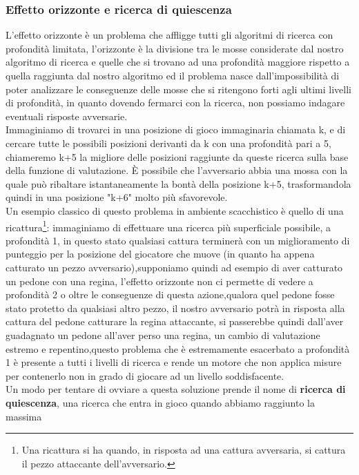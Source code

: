 \subsubsection{Effetto orizzonte e ricerca di quiescenza}
L'effetto orizzonte è un problema che affligge tutti gli algoritmi di ricerca con profondità limitata, l'orizzonte è la divisione 
tra le mosse considerate dal nostro algoritmo di ricerca e quelle che si trovano ad una profondità maggiore rispetto a quella raggiunta dal nostro algoritmo 
ed il problema nasce dall'impossibilità di poter analizzare le conseguenze delle mosse che si ritengono forti agli ultimi livelli di profondità, in quanto dovendo fermarci con la ricerca,
non possiamo indagare eventuali risposte avversarie.\\
Immaginiamo di trovarci in una posizione di gioco immaginaria chiamata k, e di cercare tutte le possibili posizioni derivanti da k con una profondità pari a 5,
chiameremo k+5 la migliore delle posizioni raggiunte da queste ricerca sulla base della funzione di valutazione. È possibile che
l'avversario abbia una mossa con la quale può ribaltare istantaneamente la bontà della posizione k+5, trasformandola quindi in una posizione
"k+6" molto più sfavorevole.\\
Un esempio classico di questo problema in ambiente scacchistico è quello di una ricattura\footnote{Una ricattura si ha quando, in risposta ad una cattura avversaria, si cattura il pezzo attaccante dell'avversario.}: immaginiamo 
di effettuare una ricerca più superficiale possibile, a profondità 1, in questo stato qualsiasi cattura terminerà con un miglioramento di punteggio 
per la posizione del giocatore che muove (in quanto ha appena catturato un pezzo avversario),supponiamo quindi ad esempio di aver catturato un pedone con una regina,
l'effetto orizzonte non ci permette di vedere a profondità 2 o oltre le conseguenze di questa azione,qualora quel pedone fosse stato 
protetto da qualsiasi altro pezzo, il nostro avversario potrà in risposta alla cattura del pedone catturare la regina attaccante,
si passerebbe quindi dall'aver guadagnato un pedone all'aver perso una regina, un cambio di valutazione estremo e repentino,questo problema che è estremamente esacerbato a profondità 1 è presente a tutti i livelli di ricerca e rende un motore che non applica misure per contenerlo 
non in grado di giocare ad un livello soddisfacente. 
\\Un modo per tentare di ovviare a questa soluzione prende il nome di \textbf{ricerca di quiescenza}, una ricerca che entra in gioco quando abbiamo raggiunto la massima 

